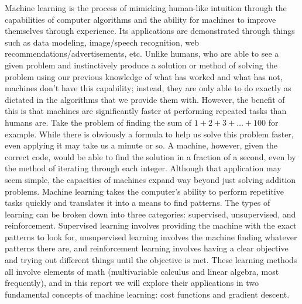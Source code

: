 \documentclass{article}
\begin{document}
Machine learning is the process of mimicking human-like intuition through the capabilities of computer algorithms and the ability for machines to improve themselves through experience. Its applications are demonstrated through things such as data modeling, image/speech recognition, web recommendations/advertisements, etc. Unlike humans, who are able to see a given problem and instinctively produce a solution or method of solving the problem using our previous knowledge of what has worked and what has not, machines don’t have this capability; instead, they are only able to do exactly as dictated in the algorithms that we provide them with. However, the benefit of this is that machines are significantly faster at performing repeated tasks than humans are. Take the problem of finding the sum of $1+2+3+…+100$ for example. While there is obviously a formula to help us solve this problem faster, even applying it may take us a minute or so. A machine, however, given the correct code, would be able to find the solution in a fraction of a second, even by the method of iterating through each integer. Although that application may seem simple, the capacities of machines expand way beyond just solving addition problems. Machine learning takes the computer’s ability to perform repetitive tasks quickly and translates it into a means to find patterns. The types of learning can be broken down into three categories: supervised, unsupervised, and reinforcement. Supervised learning involves providing the machine with the exact patterns to look for, unsupervised learning involves the machine finding whatever patterns there are, and reinforcement learning involves having a clear objective and trying out different things until the objective is met. These learning methods all involve elements of math (multivariable calculus and linear algebra, most frequently), and in this report we will explore their applications in two fundamental concepts of machine learning: cost functions and gradient descent. 
\end{document}
